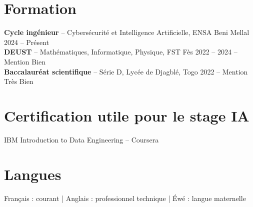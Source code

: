 \documentclass[10pt,a4paper]{article}
\newcommand{\edu}[4]{%
  \textbf{#1} -- #2 \hfill #3 #4\\[-1pt]
}
\begin{document}
\section{Formation}
\edu{Cycle ingénieur}{Cybersécurité et Intelligence Artificielle, ENSA Beni Mellal}{2024 -- Présent}{}
\edu{DEUST}{Mathématiques, Informatique, Physique, FST Fès}{2022 -- 2024}{-- Mention Bien}
\edu{Baccalauréat scientifique}{Série D, Lycée de Djagblé, Togo}{2022}{-- Mention Très Bien}

\section{Certification utile pour le stage IA}
IBM Introduction to Data Engineering -- Coursera

\section{Langues}
Français : courant | Anglais : professionnel technique | Éwé : langue maternelle
\end{document}
